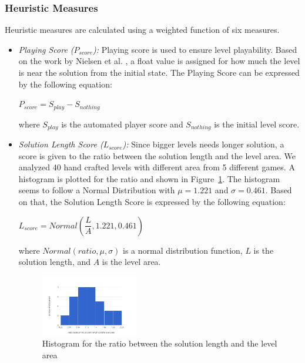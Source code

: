 \documentclass[letterpaper]{article}
\newcommand{\figref}[1]{Figure~\ref{Figure:#1}}
\begin{document}
\subsubsection{Heuristic Measures}
Heuristic measures are calculated using a weighted function of six measures.
\begin{itemize}
	\item \emph{Playing Score ($P_{score}$):} Playing score is used to ensure level playability. Based on the work by Nielsen et al. \cite{gvgpPerformanceProfiles}, a float value is assigned for how much the level is near the solution from the initial state. The Playing Score can be expressed by the following equation:
	\begin{center}$ P_{score} = S_{play} - S_{nothing}$\end{center}
	where $S_{play}$ is the automated player score and $S_{nothing}$ is the initial level score.
	
	\item\emph{Solution Length Score ($L_{score}$):} Since bigger levels needs longer solution, a score is given to the ratio between the solution length and the level area. We analyzed 40 hand crafted levels with different area from 5 different games. A histogram is plotted for the ratio and shown in \figref{solutionLengthHistogram}. The histogram seems to follow a Normal Distribution with $\mu = 1.221$ and $\sigma = 0.461$. Based on that, the Solution Length Score is expressed by the following equation:
	\begin{center}$L_{score} = Normal(\dfrac{L}{A}, 1.221, 0.461)$\end{center}
	where $Normal(ratio, \mu, \sigma)$ is a normal distribution function, $L$ is the solution length, and $A$ is the level area.
	\begin{figure}[ht]
		\centering
		\includegraphics[width=0.4\textwidth]{Images/solutionLengthHistogram}
		\caption{Histogram for the ratio between the solution length and the level area}
		\label{Figure:solutionLengthHistogram}
	\end{figure}
	

\end{itemize}
\end{document}
